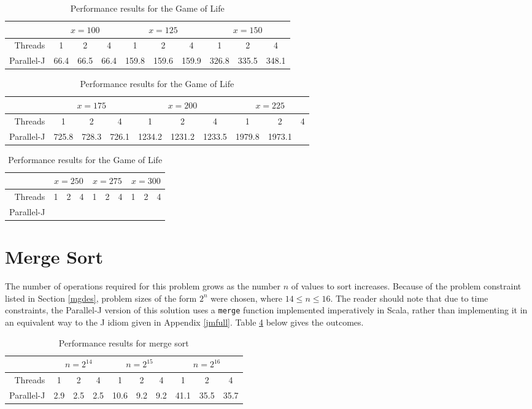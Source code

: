 \begin{table}[htbp]
\begin{tabular}{|r||c|c|c||c|c|c||c|c|c||}
	\hline
		& \multicolumn{3}{|c|}{$x=100$} & \multicolumn{3}{|c|}{$x=125$} & \multicolumn{3}{|c|}{$x=150$} \\
	\hline
		Threads & 1 & 2 & 4 & 1 & 2 & 4 & 1 & 2 & 4 \\
	\hline
	\hline
		Parallel-J & 66.4 & 66.5 & 66.4 & 159.8 & 159.6 & 159.9 & 326.8 & 335.5 & 348.1 \\
	\hline
\end{tabular}
\begin{tabular}{|r||c|c|c||c|c|c||c|c|c||}
	\hline
		& \multicolumn{3}{|c|}{$x=175$} & \multicolumn{3}{|c|}{$x=200$} & \multicolumn{3}{|c|}{$x=225$} \\
	\hline
		Threads & 1 & 2 & 4 & 1 & 2 & 4 & 1 & 2 & 4 \\
	\hline
	\hline
		Parallel-J & 725.8 & 728.3 & 726.1 & 1234.2 & 1231.2 & 1233.5 & 1979.8 & 1973.1 & \\
	\hline
\end{tabular}
\begin{tabular}{|r||c|c|c||c|c|c||c|c|c||}
	\hline
		& \multicolumn{3}{|c|}{$x=250$} & \multicolumn{3}{|c|}{$x=275$} & \multicolumn{3}{|c|}{$x=300$} \\
	\hline
		Threads & 1 & 2 & 4 & 1 & 2 & 4 & 1 & 2 & 4 \\
	\hline
	\hline
		Parallel-J & & & & & & & & & \\
	\hline
\end{tabular}
\caption{Performance results for the Game of Life}
\label{tgol}
\end{table}

\section{Merge Sort}
The number of operations required for this problem 
grows as the number $n$ of values to sort increases. 
Because of the problem constraint listed in Section \ref{mgdes}, 
problem sizes of the form $2^n$ were chosen, 
where $14 \le n \le 16$. 
The reader should note that due to time constraints, 
the Parallel-J version of this solution uses a \texttt{merge} function 
implemented imperatively in Scala, rather than 
implementing it in an equivalent way to the J idiom given in Appendix \ref{jmfull}.
Table \ref{tmrg} below gives the outcomes.

\begin{table}[htbp]
\begin{tabular}{|r||c|c|c||c|c|c||c|c|c||}
	\hline
		& \multicolumn{3}{|c|}{$n=2^{14}$} & \multicolumn{3}{|c|}{$n=2^{15}$}& \multicolumn{3}{|c|}{$n=2^{16}$} \\
	\hline
		Threads & 1 & 2 & 4 & 1 & 2 & 4 & 1 & 2 & 4 \\
	\hline
	\hline
		Parallel-J & 2.9 & 2.5 & 2.5 & 10.6 & 9.2 & 9.2 & 41.1 & 35.5 & 35.7 \\
	\hline
\end{tabular}
\caption{Performance results for merge sort}
\label{tmrg}
\end{table}
